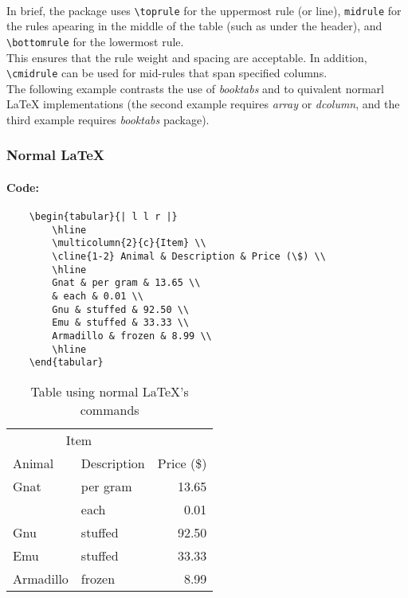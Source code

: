 \documentclass[11pt,a4paper]{article}
\begin{document}
\paragraph{}
In brief, the package uses \verb|\toprule| for the uppermost rule (or line),
\verb|midrule| for the rules apearing in the middle of the table (such as under the header),
and \verb|\bottomrule| for the lowermost rule. \\
This ensures that the rule weight and spacing are acceptable. In addition, \verb|\cmidrule|
can be used for mid-rules that span specified columns.\\
The following example contrasts the use of \emph{booktabs} and to quivalent normarl \LaTeX{}
implementations (the second example requires \emph{array} or \emph{dcolumn},
and the third example requires \emph{booktabs} package).
\subsubsection{Normal \LaTeX{}}
%
\paragraph{Code:}
\begin{verbatim}
	\begin{tabular}{| l l r |}
		\hline
		\multicolumn{2}{c}{Item} \\
		\cline{1-2} Animal & Description & Price (\$) \\
		\hline
		Gnat & per gram & 13.65 \\
		& each & 0.01 \\
		Gnu & stuffed & 92.50 \\
		Emu & stuffed & 33.33 \\
		Armadillo & frozen & 8.99 \\
		\hline
	\end{tabular}
\end{verbatim}

\begin{table}[htbp]
	\centering
	\begin{tabular}{| l l r |}
		\hline
		\multicolumn{2}{c}{Item} \\
		\cline{1-2} Animal & Description & Price (\$) \\
		\hline
		Gnat & per gram & 13.65 \\
		& each & 0.01 \\
		Gnu & stuffed & 92.50 \\
		Emu & stuffed & 33.33 \\
		Armadillo & frozen & 8.99 \\
		\hline
	\end{tabular}
	\caption{Table using normal \LaTeX{}'s commands}
	\label{nomarllatex}
\end{table}
\end{document}
